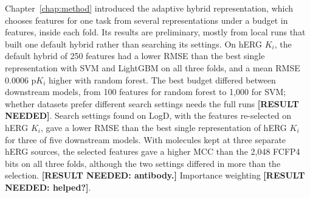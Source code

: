 Chapter~\ref{chap:method} introduced the adaptive hybrid representation, which chooses features for one task from several representations under a budget in features, inside each fold. Its results are preliminary, mostly from local runs that built one default hybrid rather than searching its settings. On hERG $K_i$, the default hybrid of 250 features had a lower RMSE than the best single representation with SVM and LightGBM on all three folds, and a mean RMSE 0.0006 p$K_i$ higher with random forest. The best budget differed between downstream models, from 100 features for random forest to 1,000 for SVM; whether datasets prefer different search settings needs the full runs \textbf{[RESULT NEEDED]}. Search settings found on LogD, with the features re-selected on hERG $K_i$, gave a lower RMSE than the best single representation of hERG $K_i$ for three of five downstream models. With molecules kept at three separate hERG sources, the selected features gave a higher MCC than the 2,048 FCFP4 bits on all three folds, although the two settings differed in more than the selection. \textbf{[RESULT NEEDED: antibody.]} Importance weighting \textbf{[RESULT NEEDED: helped?]}.

